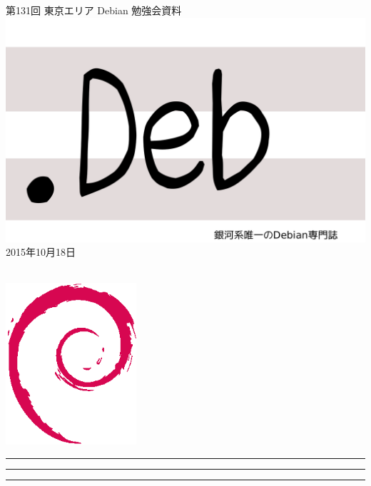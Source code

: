 \documentclass[mingoth,a4paper]{jsarticle}
\newcommand{\debmtgyear}{2015}
\newcommand{\debmtgmonth}{10}
\newcommand{\debmtgdate}{18}
\newcommand{\debmtgnumber}{131}
\begin{document}
\begin{titlepage}
\thispagestyle{empty}

\vspace*{-2cm}
第\debmtgnumber{}回 東京エリア Debian 勉強会資料\\
\hspace*{-2cm}
\includegraphics{image2012-natsu/dotdeb.pdf}\\
\hfill{}\debmtgyear{}年\debmtgmonth{}月\debmtgdate{}日

\\

\vspace*{-2cm}
\hfill{}\includegraphics[height=6cm]{image200502/openlogo-nd.eps}
\end{titlepage}

\newpage

\begin{minipage}[b]{0.2\hsize}
 \colorbox{titleback}{}
\end{minipage}
\begin{minipage}[b]{0.8\hsize}
\hrule
\vspace{2mm}
\hrule
\begin{multicols}{2}
\tableofcontents
\end{multicols}
\vspace{2mm}
\hrule
\end{minipage}
\end{document}
